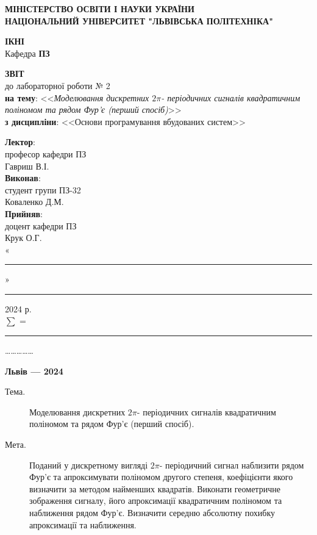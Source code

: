 \documentclass[oneside,14pt]{extarticle}
\newcommand\subject{Основи програмування вбудованих систем}
\newcommand\lecturer{професор кафедри ПЗ\\Гавриш В.І.}
\newcommand\teacher{доцент кафедри ПЗ\\Крук О.Г.}
\newcommand\mygroup{ПЗ-32}
\newcommand\lab{2}
\newcommand\theme{Моделювання дискретних $2\pi$- періодичних сигналів квадратичним
поліномом та рядом Фур’є (перший спосіб)}
\newcommand\purpose{Поданий у дискретному вигляді $2\pi$- періодичний сигнал
наблизити рядом Фур’є та апроксимувати поліномом другого степеня,
коефіцієнти якого визначити за методом найменших квадратів. Виконати
геометричне зображення сигналу, його апроксимації квадратичним поліномом
та наближення рядом Фур’є. Визначити середню абсолютну похибку
апроксимації та наближення}
\begin{document}
\begin{normalsize}
	\begin{titlepage}
		\thispagestyle{empty}
		\begin{center}
			\textbf{МІНІСТЕРСТВО ОСВІТИ І НАУКИ УКРАЇНИ\\
				НАЦІОНАЛЬНИЙ УНІВЕРСИТЕТ "ЛЬВІВСЬКА ПОЛІТЕХНІКА"}
		\end{center}
		\begin{flushright}
			\textbf{ІКНІ}\\
			Кафедра \textbf{ПЗ}
		\end{flushright}
		\vspace{120pt}
		\begin{center}
			\textbf{ЗВІТ}\\
			\vspace{10pt}
			до лабораторної роботи № \lab\\
			\textbf{на тему}: <<\textit{\theme}>>\\
			\textbf{з дисципліни}: <<\subject>>
		\end{center}
		\vspace{40pt}
		\begin{flushright}
			
			\textbf{Лектор}:\\
			\lecturer\\
			\vspace{28pt}
			\textbf{Виконав}:\\
			
			студент групи \mygroup\\
			Коваленко Д.М.\\
			\vspace{28pt}
			\textbf{Прийняв}:\\
			
			\teacher\\
			
			\vspace{28pt}
			«\rule{1cm}{0.15mm}» \rule{1.5cm}{0.15mm} 2024 р.\\
			$\sum$ = \rule{1cm}{0.15mm}……………\\
			
		\end{flushright}
		\vspace{\fill}
		\begin{center}
			\textbf{Львів — 2024}
		\end{center}
	\end{titlepage}
		
	\begin{description}
		\item[Тема.] \theme.
		\item[Мета.] \purpose.
	\end{description}


\end{normalsize}
\end{document}
